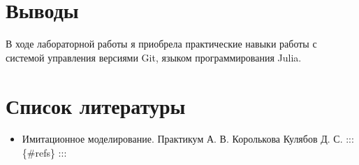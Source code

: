 \documentclass[
  english,
  russian,
  12pt,
  a4paper,
  DIV=11,
  numbers=noendperiod]{scrreprt}
\providecommand{\tightlist}{%
  \setlength{\itemsep}{0pt}\setlength{\parskip}{0pt}}
\begin{document}
\chapter{Выводы}\label{ux432ux44bux432ux43eux434ux44b}

В ходе лабораторной работы я приобрела практические навыки работы с
системой управления версиями Git, языком программирования Julia.

\chapter*{Список
литературы}\label{ux441ux43fux438ux441ux43eux43a-ux43bux438ux442ux435ux440ux430ux442ux443ux440ux44b}

\begin{itemize}
\tightlist
\item
  Имитационное моделирование. Практикум А. В. Королькова Кулябов Д. С.
  ::: \{\#refs\} :::
\end{itemize}


\printbibliography
\end{document}

